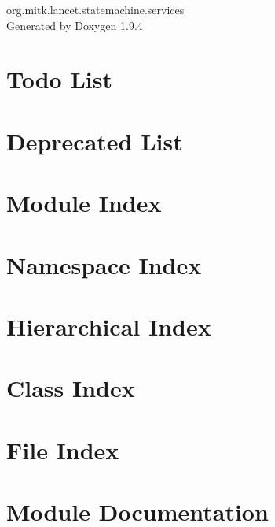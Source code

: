 \documentclass[twoside]{book}
\newcommand{\+}{\discretionary{\mbox{\scriptsize$\hookleftarrow$}}{}{}}
\newcommand{\clearemptydoublepage}{%
    \newpage{\pagestyle{empty}\cleardoublepage}%
  }
\begin{document}
  \raggedbottom
    \hypersetup{pageanchor=false,
                bookmarksnumbered=true,
                pdfencoding=unicode
               }
  \begin{titlepage}
  \vspace*{7cm}
  \begin{center}%
  {\Large org.\+mitk.\+lancet.\+statemachine.\+services}\\
  \vspace*{1cm}
  {\large Generated by Doxygen 1.9.4}\\
  \end{center}
  \end{titlepage}
  \clearemptydoublepage
  \tableofcontents
  \clearemptydoublepage
  \hypersetup{pageanchor=true}
\chapter{Todo List}
\label{todo}

\chapter{Deprecated List}
\label{deprecated}

\chapter{Module Index}

\chapter{Namespace Index}

\chapter{Hierarchical Index}

\chapter{Class Index}

\chapter{File Index}

\chapter{Module Documentation}

\end{document}
